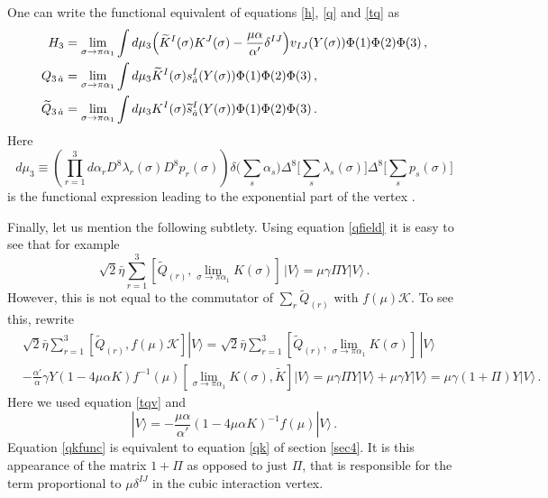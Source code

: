 \documentclass[12pt]{article}
\def\da{\dot{a}}
\def\D{\Delta}
\def\a{\alpha}
\def\g{\gamma}
\def\d{\delta}
\def\m{\mu}
\def\s{\sigma}
\def\l{\lambda}
\def\mc{\mathcal}
\def\ra{\rangle}
\def\wt{\widetilde}
\numberwithin{equation}{section} \setlength{\textwidth}{17cm}
\begin{document}
\noindent One can write the functional equivalent of equations
\eqref{h}, \eqref{q} and \eqref{tq} as 
\begin{align}
H_3 & = \lim_{\s\to\pi\a_1}\int d\m_3
\Bigl(\wt{K}^I(\s)K^J(\s)-\frac{\m\a}{\a'}\d^{IJ}\Bigr)v_{IJ}(Y(\s))\Phi(1)\Phi(2)\Phi(3)\,,\\
Q_{3\,\da} & = \lim_{\s\to\pi\a_1}\int 
d\m_3\wt{K}^I(\s)s^I_{\da}(Y(\s))\Phi(1)\Phi(2)\Phi(3)\,,\\
\wt{Q}_{3\,\da} & = \lim_{\s\to\pi\a_1}\int 
d\m_3K^I(\s)\wt{s}^I_{\da}(Y(\s))\Phi(1)\Phi(2)\Phi(3)\,.
\end{align}
Here
\begin{equation}
d\m_3\equiv \left(\prod_{r=1}^3d\a_rD^8\l_r(\s)D^8p_r(\s)\right)
\d\bigl(\sum_s\a_s\bigr)\D^8\bigl[\sum_s\l_s(\s)\bigr]\D^8\bigl[\sum_sp_s(\s)\bigr]
\end{equation}
is the functional expression leading to the exponential part of the vertex \cite{gs,gsb}.

\noindent Finally, let us mention the following subtlety. Using equation \eqref{qfield} it is
easy to see that for example 
\begin{equation}
\sqrt{2}\bar{\eta}\sum_{r=1}^3[\wt{Q}_{(r)},\lim_{\s\to\pi\a_1}K(\s)]\,|V\ra=
\m\g\Pi Y|V\ra\,.
\end{equation}
However, this is not equal to the commutator of $\sum_r\wt{Q}_{(r)}$ with $f(\m){\mc K}$. To see this,
rewrite
\begin{align}
&\sqrt{2}\bar{\eta}\sum_{r=1}^3[\wt{Q}_{(r)},f(\m){\mc K}]|V\ra=
\sqrt{2}\bar{\eta}\sum_{r=1}^3[\wt{Q}_{(r)},\lim_{\s\to\pi\a_1}K(\s)]\,|V\ra
\nonumber\\
\label{qkfunc}
&-\frac{\a'}{\a}\g Y(1-4\m\a K)f^{-1}(\m)[\lim_{\s\to\pi\a_1}K(\s),\wt{K}]|V\ra=
\m\g\Pi Y|V\ra+\m\g Y|V\ra=\m\g(1+\Pi)Y|V\ra\,.
\end{align}
Here we used equation \eqref{tqv} and 
\begin{equation}
[\lim_{\s\to\pi\a_1}K(\s),\wt{K}]|V\ra=
-\frac{\m\a}{\a'}(1-4\m\a K)^{-1}f(\m)|V\ra\,.
\end{equation}
Equation \eqref{qkfunc} is equivalent to equation
\eqref{qk} of section \ref{sec4}. It is this appearance of the matrix $1+\Pi$ as opposed to
just $\Pi$, that is responsible for the term proportional to $\m\d^{IJ}$ in the cubic
interaction vertex.
\end{document}
